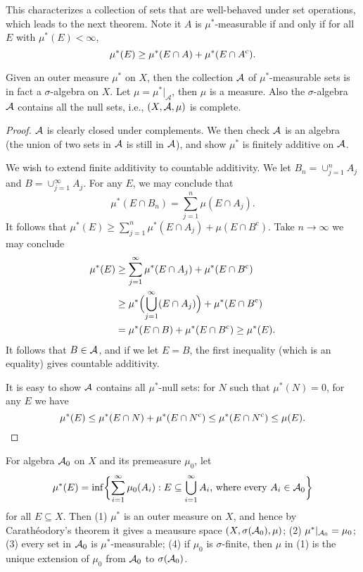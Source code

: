     This characterizes a collection of sets that are well-behaved under set operations, which leads to the next theorem. Note it $A$ is $\mu^{*}$-measurable if and only if for all $E$ with $\mu^{*}(E)<\infty$, \[
        \mu^{*}(E)\geq\mu^{*}(E\cap A)+\mu^{*}(E\cap A^{\mathrm{c}}).\]
\begin{namedthm}
    Given an outer measure $\mu^{*}$ on $X$, then the collection $\mathcal{A}$ of $\mu^{*}$-measurable sets is in fact a $\sigma$-algebra on $X$. Let $\mu=\mu^{*}|_{\mathcal{A}}$, then $\mu$ is a measure. Also the $\sigma$-algebra $\mathcal{A}$ contains all the null sets, i.e., $(X,\mathcal{A},\mu)$ is complete.
\end{namedthm}

\begin{proof}
$\mathcal{A}$ is clearly closed under complements. We then check $\mathcal{A}$ is an algebra (the union of two sets in $\mathcal{A}$ is still in $\mathcal{A}$), and show $\mu^{*}$ is finitely additive on $\mathcal{A}$.

We wish to extend finite additivity to countable additivity. We let
$B_{n}=\cup_{j=1}^{n}A_{j}$ and $B=\cup_{j=1}^{\infty}A_{j}$. For
any $E$, we may conclude that 
\[
\mu^{*}(E\cap B_{n})=\sum_{j=1}^{n}\mu(E\cap A_{j}).
\]
It follows that $\mu^{*}(E)\geq\sum_{j=1}^{n}\mu^{*}(E\cap A_{j})+\mu(E\cap B^{\mathrm{c}}).$
Take $n\to\infty$ we may conclude 
\begin{align*}
\mu^{*}(E) & \geq\sum_{j=1}^{\infty}\mu^{*}(E\cap A_{j})+\mu^{*}(E\cap B^{\mathrm{c}})\\
 & \geq\mu^{*}\Bigl(\bigcup_{j=1}^{\infty}(E\cap A_{j})\Bigr)+\mu^{*}(E\cap B^{\mathrm{c}})\\
 & =\mu^{*}(E\cap B)+\mu^{*}(E\cap B^{\mathrm{c}})\geq\mu^{*}(E).
\end{align*}
It follows that $B\in\mathcal{A}$, and if we let $E=B$, the first inequality
(which is an equality) gives countable additivity.

It is easy to show $\mathcal{A}$ contains all $\mu^{*}$-null sets: for $N$
such that $\mu^{*}(N)=0$, for any $E$ we have 
\[
\mu^{*}(E)\leq\mu^{*}(E\cap N)+\mu^{*}(E\cap N^{\mathrm{c}})\leq\mu^{*}(E\cap N^{\mathrm{c}})\leq\mu(E).\qedhere
\]
\end{proof}

\begin{namedthm} \label{thm:Caratheodory-ext}
    For algebra $\mathcal{A}_{0}$ on $X$ and its premeasure
$\mu_{0}$, let 
\[
\mu^{*}(E)=\inf\biggl\{\sum_{i=1}^{\infty}\mu_{0}(A_{i}):E\subseteq\bigcup_{i=1}^{\infty}A_{i}\text{, where every }A_{i}\in\mathcal{A}_{0}\biggr\}
\]
for all $E\subseteq X$. Then (1) $\mu^{*}$ is an outer measure on $X$, and hence by Carathéodory's theorem it gives a meausure space
$(X,\sigma(\mathcal{A}_{0}),\mu)$; (2) $\mu^{*}|_{\mathcal{A}_{0}}=\mu_{0}$; (3) every
set in $\mathcal{A}_{0}$ is $\mu^{*}$-measurable; (4) if $\mu_{0}$ is $\sigma$-finite,
then $\mu$ in (1) is the unique extension of $\mu_{0}$ from $\mathcal{A}_{0}$
to $\sigma(\mathcal{A}_{0})$.
\end{namedthm}

